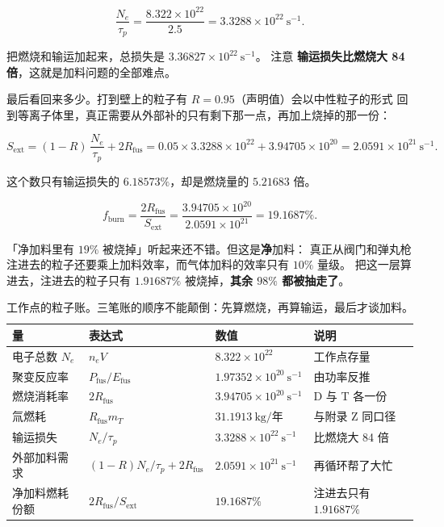 \begin{equation}
\frac{N_e}{\tau_p} = \frac{8.322\times10^{22}}{2.5}
= 3.3288\times10^{22}\ \mathrm{s^{-1}}.
\label{eq:app-aj-loss}
\end{equation}

把燃烧和输运加起来，总损失是 $3.36827\times10^{22}\ \mathrm{s^{-1}}$。
注意 \textbf{输运损失比燃烧大 84 倍}，这就是加料问题的全部难点。

最后看回来多少。打到壁上的粒子有 $R = 0.95$（声明值）会以中性粒子的形式
回到等离子体里，真正需要从外部补的只有剩下那一点，再加上烧掉的那一份：

\begin{equation}
S_{\mathrm{ext}} = (1-R)\,\frac{N_e}{\tau_p} + 2R_{\mathrm{fus}}
= 0.05\times3.3288\times10^{22} + 3.94705\times10^{20}
= 2.0591\times10^{21}\ \mathrm{s^{-1}}.
\label{eq:app-aj-recycle}
\end{equation}

这个数只有输运损失的 $6.18573\%$，却是燃烧量的 $5.21683$ 倍。

\begin{equation}
f_{\mathrm{burn}} = \frac{2R_{\mathrm{fus}}}{S_{\mathrm{ext}}}
= \frac{3.94705\times10^{20}}{2.0591\times10^{21}} = 19.1687\%.
\label{eq:app-aj-burnfrac}
\end{equation}

「净加料里有 $19\%$ 被烧掉」听起来还不错。但这是\textbf{净}加料：
真正从阀门和弹丸枪注进去的粒子还要乘上加料效率，而气体加料的效率只有 $10\%$ 量级。
把这一层算进去，注进去的粒子只有 $1.91687\%$ 被烧掉，\textbf{其余 $98\%$ 都被抽走了}。

\begin{table}[htbp]
\centering
\small
\caption{工作点的粒子账。三笔账的顺序不能颠倒：先算燃烧，再算输运，最后才谈加料。}
\label{tab:app-aj-balance}
\begin{tabular}{p{3.2cm}p{3.2cm}p{3.1cm}p{3.8cm}}
\toprule
量 & 表达式 & 数值 & 说明 \\
\midrule
电子总数 $N_e$ & $n_eV$ & $8.322\times10^{22}$ & 工作点存量 \\
聚变反应率 & $P_{\mathrm{fus}}/E_{\mathrm{fus}}$ & $1.97352\times10^{20}\ \mathrm{s^{-1}}$ & 由功率反推 \\
燃烧消耗率 & $2R_{\mathrm{fus}}$ & $3.94705\times10^{20}\ \mathrm{s^{-1}}$ & D 与 T 各一份 \\
氚燃耗 & $R_{\mathrm{fus}}m_T$ & $31.1913\ \text{kg/年}$ & 与附录 Z 同口径 \\
输运损失 & $N_e/\tau_p$ & $3.3288\times10^{22}\ \mathrm{s^{-1}}$ & 比燃烧大 84 倍 \\
外部加料需求 & $(1-R)N_e/\tau_p + 2R_{\mathrm{fus}}$ & $2.0591\times10^{21}\ \mathrm{s^{-1}}$ & 再循环帮了大忙 \\
净加料燃耗份额 & $2R_{\mathrm{fus}}/S_{\mathrm{ext}}$ & $19.1687\%$ & 注进去只有 $1.91687\%$ \\
\bottomrule
\end{tabular}

\end{table}

